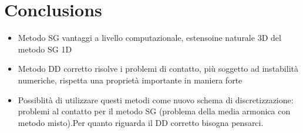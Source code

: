 \section{Conclusions}


\begin{itemize}
\item Metodo SG vantaggi a livello computazionale, estensoine naturale 3D del metodo SG 1D
\item Metodo DD corretto risolve i problemi di contatto, pi\`u soggetto ad instabilit\`a numeriche, rispetta una propriet\`a importante in maniera forte
\item Possiblit\`a di utilizzare questi metodi come nuovo schema di discretizzazione: problemi al contatto per il metodo SG (problema della media armonica con metodo misto).Per quanto riguarda il DD corretto bisogna pensarci.
\end{itemize}